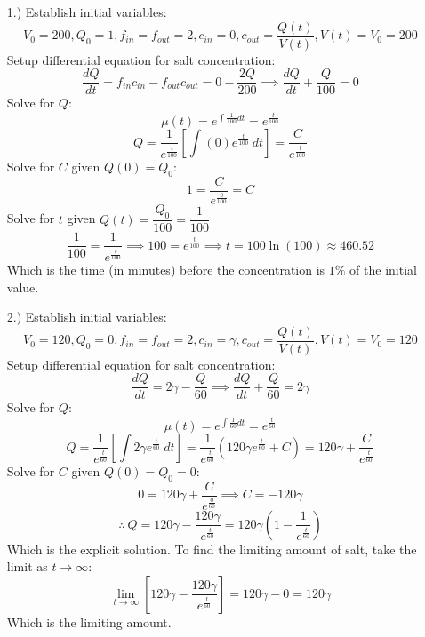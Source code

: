 \documentclass[12pt]{article}
\newcommand{\bracks}[1]{\left[#1\right]}
\begin{document}
\pagestyle{fancy}
\fancyhead{}

\begin{itemize}
    \item [1.)] Establish initial variables:
    \[V_0=200,Q_0=1,f_{in}=f_{out}=2,c_{in}=0,c_{out}=\frac{Q(t)}{V(t)},V(t)=V_0=200\]
    Setup differential equation for salt concentration:
    \[\frac{dQ}{dt}=f_{in}c_{in}-f_{out}c_{out}=0-\frac{2Q}{200}\implies\frac{dQ}{dt}+\frac{Q}{100}=0\]
    Solve for $Q$:
    \[\mu(t)=e^{\int\frac{1}{100}dt}=e^{\frac{t}{100}}\]
    \[Q=\frac{1}{e^{\frac{t}{100}}}\bracks{\int(0)e^{\frac{t}{100}}\ dt}=\frac{C}{e^{\frac{t}{100}}}\]
    Solve for $C$ given $Q(0)=Q_0$:
    \[1=\frac{C}{e^{\frac{0}{100}}}=C\]
    Solve for $t$ given $Q(t)=\dfrac{Q_0}{100}=\dfrac{1}{100}$
    \[\frac{1}{100}=\frac{1}{e^\frac{t}{100}}\implies100=e^\frac{t}{100}\implies t=100\ln(100)\approx460.52\]
    Which is the time (in minutes) before the concentration is $1\%$ of the initial value.

    \item [2.)] Establish initial variables:
    \[V_0=120,Q_0=0,f_{in}=f_{out}=2,c_{in}=\gamma,c_{out}=\frac{Q(t)}{V(t)},V(t)=V_0=120\]
    Setup differential equation for salt concentration:
    \[\frac{dQ}{dt}=2\gamma-\frac{Q}{60}\implies\frac{dQ}{dt}+\frac{Q}{60}=2\gamma\]
    Solve for $Q$:
    \[\mu(t)=e^{\int\frac{1}{60}dt}=e^\frac{t}{60}\]
    \[Q=\frac{1}{e^\frac{t}{60}}\bracks{\int2\gamma e^\frac{t}{60}\ dt}=\frac{1}{e^\frac{t}{60}}\left(120\gamma e^\frac{t}{60}+C\right)=120\gamma+\frac{C}{e^\frac{t}{60}}\]
    Solve for $C$ given $Q(0)=Q_0=0$:
    \[0=120\gamma+\frac{C}{e^\frac{0}{60}}\implies C=-120\gamma\]
    \[\therefore\ Q=120\gamma-\frac{120\gamma}{e^\frac{t}{60}}=120\gamma\left(1-\frac{1}{e^\frac{t}{60}}\right)\]
    Which is the explicit solution. To find the limiting amount of salt, take the limit as $t\rightarrow\infty$:
    \[\lim_{t\rightarrow\infty}\bracks{120\gamma-\frac{120\gamma}{e^\frac{t}{60}}}=120\gamma-0=120\gamma\]
    Which is the limiting amount.


\end{itemize}
\end{document}
